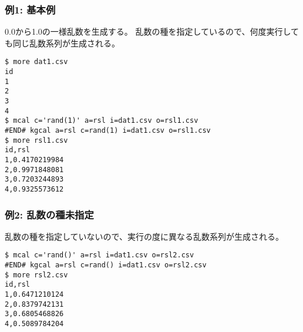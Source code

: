 \subsubsection*{例1: 基本例}

0.0から1.0の一様乱数を生成する。
乱数の種を指定しているので、何度実行しても同じ乱数系列が生成される。


\begin{Verbatim}[baselinestretch=0.7,frame=single]
$ more dat1.csv
id
1
2
3
4
$ mcal c='rand(1)' a=rsl i=dat1.csv o=rsl1.csv
#END# kgcal a=rsl c=rand(1) i=dat1.csv o=rsl1.csv
$ more rsl1.csv
id,rsl
1,0.4170219984
2,0.9971848081
3,0.7203244893
4,0.9325573612
\end{Verbatim}
\subsubsection*{例2: 乱数の種未指定}

乱数の種を指定していないので、実行の度に異なる乱数系列が生成される。


\begin{Verbatim}[baselinestretch=0.7,frame=single]
$ mcal c='rand()' a=rsl i=dat1.csv o=rsl2.csv
#END# kgcal a=rsl c=rand() i=dat1.csv o=rsl2.csv
$ more rsl2.csv
id,rsl
1,0.6471210124
2,0.8379742131
3,0.6805468826
4,0.5089784204
\end{Verbatim}
